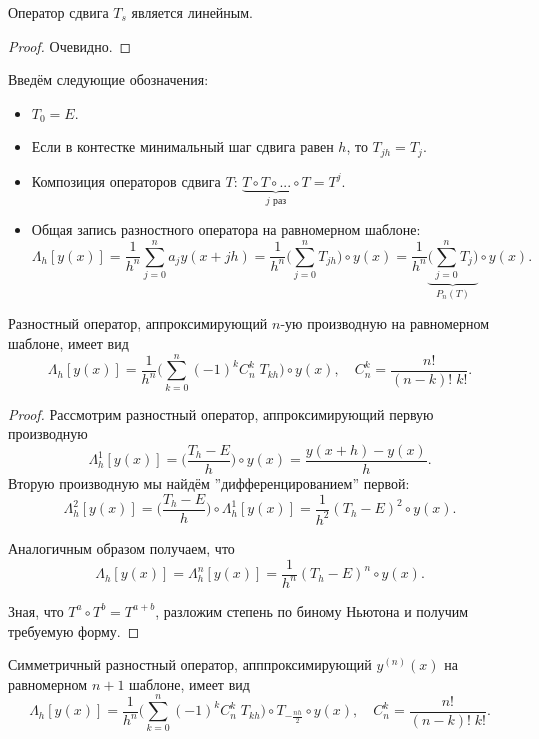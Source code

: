 \documentclass[../main.tex]{subfile}
\begin{document}
\begin{lemma}
	Оператор сдвига $T_s$ является линейным.
\end{lemma}

\begin{proof}
	Очевидно.
\end{proof}

\begin{define}
	Введём следующие обозначения:
	\begin{itemize}[nosep]
		\item $T_0=E$.
		\item Если в контестке минимальный шаг сдвига равен $h$, то
			$T_{jh}=T_j$.
		\item Композиция операторов сдвига $T$: $\underset{j\text{ раз}}
			{\underbrace{T\circ T\circ...\circ T}}=T^j$.
		\item Общая запись разностного оператора на равномерном шаблоне:
			\[\Lambda_h[y(x)]=\frac{1}{h^n}\sum_{j=0}^{n}a_jy(x+jh)=
			\frac{1}{h^n}\Big(\sum_{j=0}^{n}T_{jh}\Big)\circ y(x)=
			\frac{1}{h^n}\underset{P_n(T)}{\underbrace{\Big(
			\sum_{j=0}^{n}T_j\Big)}}\circ y(x).\]
	\end{itemize}
\end{define}

\begin{theorem}
	Разностный оператор, аппроксимирующий $n$-ую производную на равномерном
	шаблоне, имеет вид
	\[\boxed{\Lambda_h[y(x)]=\frac{1}{h^n}\Big(\sum_{k=0}^{n}(-1)^kC_n^k\;
	T_{kh}\Big)\circ y(x)},\quad C_n^k=\frac{n!}{(n-k)!\;k!}.\]
\end{theorem}

\begin{proof}
	Рассмотрим разностный оператор, аппроксимирующий первую производную
	\[\Lambda_h^1[y(x)]=\Big(\frac{T_h-E}{h}\Big)\circ y(x)=\frac{y(x+h)-
	y(x)}{h}.\]
	Вторую производную мы найдём ''дифференцированием'' первой:
	\[\Lambda_h^2[y(x)]=\Big(\frac{T_h-E}{h}\Big)\circ\Lambda_h^1[y(x)]=
	\frac{1}{h^2}(T_h-E)^2\circ y(x).\]

	Аналогичным образом получаем, что
	\[\Lambda_h[y(x)]=\Lambda_h^n[y(x)]=\frac{1}{h^n}(T_h-E)^n\circ y(x).\]

	Зная, что $T^a\circ T^b=T^{a+b}$, разложим степень по биному Ньютона
	и получим требуемую форму.
\end{proof}

\begin{corollary}
	Симметричный разностный оператор, апппроксимирующий $y^{(n)}(x)$ на 
	равномерном $n+1$ шаблоне, имеет вид
	\[\boxed{\Lambda_h[y(x)]=\frac{1}{h^n}\Big(\sum_{k=0}^{n}(-1)^kC_n^k\;
	T_{kh}\Big)\circ T_{-\frac{nh}{2}}\circ y(x)},\quad C_n^k=\frac{n!}
	{(n-k)!\;k!}.\]
\end{corollary}
\end{document}
